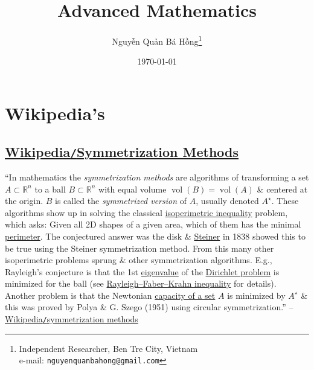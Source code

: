 \documentclass[oneside]{book}
\title{Advanced Mathematics}
\author{\selectlanguage{vietnamese} Nguyễn Quản Bá Hồng\footnote{Independent Researcher, Ben Tre City, Vietnam\\e-mail: \texttt{nguyenquanbahong@gmail.com}}}
\date{\today}
\numberwithin{equation}{section}
\begin{document}
\maketitle
\setcounter{secnumdepth}{4}
\setcounter{tocdepth}{4}
\tableofcontents


\chapter{Wikipedia's}

\section{\href{https://en.wikipedia.org/wiki/Symmetrization_methods}{Wikipedia\texttt{/}Symmetrization Methods}}
``In mathematics the \textit{symmetrization methods} are algorithms of transforming a set $A\subset\mathbb{R}^n$ to a ball $B\subset\mathbb{R}^n$ with equal volume $\operatorname{vol}(B) = \operatorname{vol}(A)$ \& centered at the origin. $B$ is called the \textit{symmetrized version} of $A$, usually denoted $A^\star$. These algorithms show up in solving the classical \href{https://en.wikipedia.org/wiki/Isoperimetric_inequality}{isoperimetric inequality} problem, which asks: Given all 2D shapes of a given area, which of them has the minimal \href{https://en.wikipedia.org/wiki/Perimeter}{perimeter}. The conjectured answer was the disk \& \href{https://en.wikipedia.org/wiki/Jakob_Steiner}{Steiner} in 1838 showed this to be true using the Steiner symmetrization method. From this many other isoperimetric problems sprung \& other symmetrization algorithms. E.g., Rayleigh's conjecture is that the 1st \href{https://en.wikipedia.org/wiki/Eigenvalue}{eigenvalue} of the \href{https://en.wikipedia.org/wiki/Dirichlet_problem}{Dirichlet problem} is minimized for the ball (see \href{https://en.wikipedia.org/wiki/Rayleigh%E2%80%93Faber%E2%80%93Krahn_inequality}{Rayleigh--Faber--Krahn inequality} for details). Another problem is that the Newtonian \href{https://en.wikipedia.org/wiki/Capacity_of_a_set}{capacity of a set} $A$ is minimized by $A^\star$ \& this was proved by Polya \& G. Szego (1951) using circular symmetrization.'' -- \href{https://en.wikipedia.org/wiki/Symmetrization_methods}{Wikipedia\texttt{/}symmetrization methods}
\end{document}
